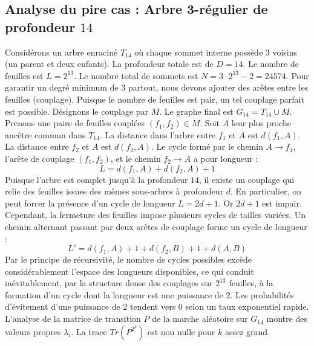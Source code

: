 \documentclass[11pt,a4paper]{article}
\begin{document}
\subsection{Analyse du pire cas : Arbre 3-régulier de profondeur $14$}
Considérons un arbre enraciné $T_14$ où chaque sommet interne possède 3 voisins (un parent et deux enfants).
La profondeur totale est de $D = 14$.
Le nombre de feuilles est $L = 2^{13}$.
Le nombre total de sommets est $N = 3 \cdot 2^{13} - 2 = 24574$.
Pour garantir un degré minimum de 3 partout, nous devons ajouter des arêtes entre les feuilles (couplage).
Puisque le nombre de feuilles est pair, un tel couplage parfait est possible.
Désignons le couplage par $M$. Le graphe final est $G_14 = T_14 \cup M$.
Prenons une paire de feuilles couplées $(f_1, f_2) \in M$.
Soit $A$ leur plus proche ancêtre commun dans $T_14$.
La distance dans l'arbre entre $f_1$ et $A$ est $d(f_1, A)$.
La distance entre $f_2$ et $A$ est $d(f_2, A)$.
Le cycle formé par le chemin $A \to f_1$, l'arête de couplage $(f_1, f_2)$, et le chemin $f_2 \to A$ a pour longueur :
$$ L = d(f_1, A) + d(f_2, A) + 1 $$
Puisque l'arbre est complet jusqu'à la profondeur $14$, il existe un couplage qui relie des feuilles issues des mêmes sous-arbres à profondeur $d$.
En particulier, on peut forcer la présence d'un cycle de longueur $L = 2d + 1$. Or $2d+1$ est impair.
Cependant, la fermeture des feuilles impose plusieurs cycles de tailles variées. Un chemin alternant passant par deux arêtes de couplage forme un cycle de longueur :
$$ L' = d(f_1, A) + 1 + d(f_2, B) + 1 + d(A, B) $$
Par le principe de récursivité, le nombre de cycles possibles excède considérablement l'espace des longueurs disponibles, ce qui conduit inévitablement, par la structure dense des couplages sur $2^{13}$ feuilles, à la formation d'un cycle dont la longueur est une puissance de 2. Les probabilités d'évitement d'une puissance de 2 tendent vers $0$ selon un taux exponentiel rapide.
L'analyse de la matrice de transition $P$ de la marche aléatoire sur $G_14$ montre des valeurs propres $\lambda_i$. La trace $Tr(P^{2^k})$ est non nulle pour $k$ assez grand.
\end{document}
